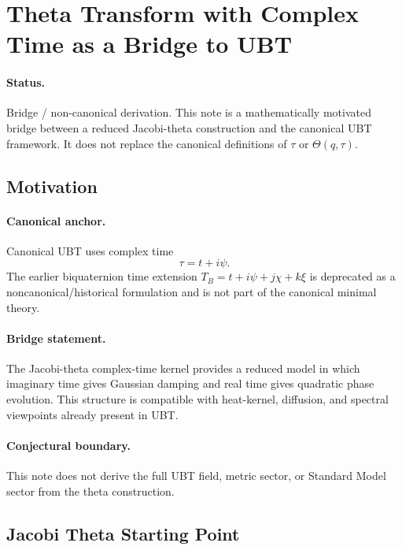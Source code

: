 \documentclass[11pt,a4paper]{article}
\begin{document}
\section{Theta Transform with Complex Time as a Bridge to UBT}
\label{sec:theta_complex_time_bridge}

\paragraph{Status.}
Bridge / non-canonical derivation. This note is a mathematically motivated bridge between a reduced Jacobi-theta construction and the canonical UBT framework. It does not replace the canonical definitions of $\tau$ or $\Theta(q,\tau)$.

\subsection{Motivation}

\paragraph{Canonical anchor.}
Canonical UBT uses complex time
\begin{equation}
\tau = t + i\psi.
\end{equation}
The earlier biquaternion time extension $T_B = t + i\psi + j\chi + k\xi$ is deprecated as a
noncanonical/historical formulation and is not part of the canonical minimal theory.

\paragraph{Bridge statement.}
The Jacobi-theta complex-time kernel provides a reduced model in which imaginary time gives Gaussian damping and real time gives quadratic phase evolution. This structure is compatible with heat-kernel, diffusion, and spectral viewpoints already present in UBT.

\paragraph{Conjectural boundary.}
This note does not derive the full UBT field, metric sector, or Standard Model sector from the theta construction.

\subsection{Jacobi Theta Starting Point}
\end{document}
